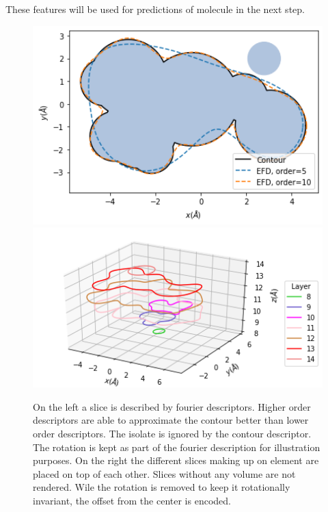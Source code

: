 These features will be used for predictions of molecule in the next step.

\begin{figure}[!htb]
    \includegraphics[width=1.0\textwidth]{figures/fourier/contour.png}
  \endminipage\hfill
    \includegraphics[width=1.0\textwidth]{figures/fourier/fourier-slices.png}
  \endminipage
  \caption{
  On the left a slice is described by fourier descriptors. Higher order descriptors are able to approximate the contour better than lower order descriptors. 
  The isolate is ignored by the contour descriptor. The rotation is kept as part of the fourier description for illustration purposes.
  On the right the different slices making up on element are placed on top of each other. Slices without any volume are not rendered. 
  Wile the rotation is removed to keep it rotationally invariant, the offset from the center is encoded.
  }
  \label{fig:slice-layered}
\end{figure}


